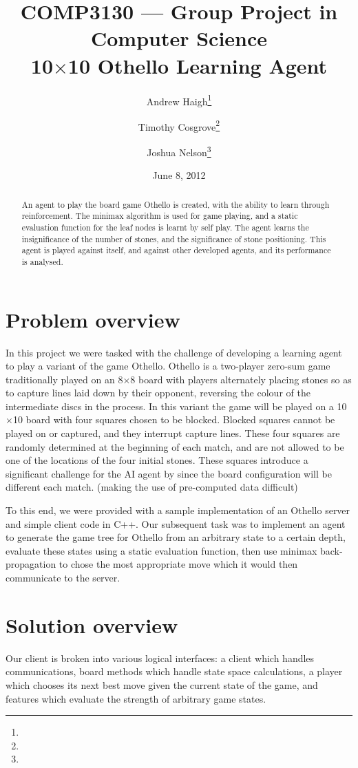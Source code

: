 \documentclass[11pt]{article}
\title{%
  COMP3130 --- Group Project in Computer Science \\
  10$\times$10 Othello Learning Agent}
\date{June 8, 2012}
\author{%
  Andrew Haigh\thanks{\uid{u4667010}} \and %
  Timothy Cosgrove\thanks{\uid{u4843619}} \and
  Joshua Nelson\thanks{\uid{u4850020}}}
\begin{document}
\maketitle
\begin{abstract}
  \label{abstract}
  An agent to play the board game Othello is created, with the ability
  to learn through reinforcement. The minimax algorithm is used for game
  playing, and a static evaluation function for the leaf nodes is learnt by
  self play.  The agent learns the insignificance of the number of stones, and
  the significance of stone positioning. This agent is played against itself,
  and against other developed agents, and its performance is analysed.
\end{abstract}
\clearpage

\section{Problem overview}
\label{sec:problem_overview}
In this project we were tasked with the challenge of developing a learning
agent to play a variant of the game Othello. Othello is a two-player zero-sum
game traditionally played on an 8$\times$8 board with players alternately
placing stones so as to capture lines laid down by their opponent, reversing
the colour of the intermediate discs in the process.
In this variant the game will be played on a 10$\times$10 board with four
squares chosen to be blocked. Blocked squares cannot be played on or captured,
and they interrupt capture lines. These four squares are randomly determined at
the beginning of each match, and are not allowed to be one of the
locations of the four initial stones. These squares introduce a significant challenge
for the AI agent by since the board configuration will be different each match.
(making the use of pre-computed data difficult)

To this end, we were provided with a sample implementation of an Othello
server and simple client code in C++. Our subsequent task was to implement an
agent to generate the game tree for Othello from an arbitrary state to a
certain depth, evaluate these states using a static evaluation function, then
use minimax back-propagation to chose the most appropriate move which it would
then communicate to the server.

\section{Solution overview}
\label{sec:solution_overview}
Our client is broken into various logical interfaces: a client which handles
communications, board methods which handle state space calculations, a player
which chooses its next best move given the current state of the game, and
features which evaluate the strength of arbitrary game states.
\end{document}
